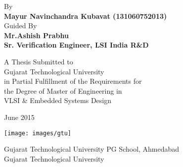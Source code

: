 \begin{titlepage}
	\begin{center}
		\vspace*{1cm}
		
		
		\vspace{0.5cm}
		
		\vspace{1.5cm}
		
			\normalsize
			By\\
			\textbf{Mayur Navinchandra Kubavat (131060752013)} \\
			Guided By\\
			\textbf{Mr.Ashish Prabhu}\\
			\textbf{Sr. Verification Engineer, LSI India R\&D}

		\vspace{2cm}
				
		A Thesis Submitted to\\
		Gujarat Technological University \\
		in Partial Fulfillment of the Requirements for\\
		the Degree of Master of Engineering in \\
		VLSI \& Embedded Systems Design
		
		June 2015
		\vspace{1.5cm}
		
		\texttt{[image: images/gtu]}
		
		Gujarat Technological University PG School, Ahmedabad\\
		Gujarat Technological University
	
		
	\end{center}
\end{titlepage}